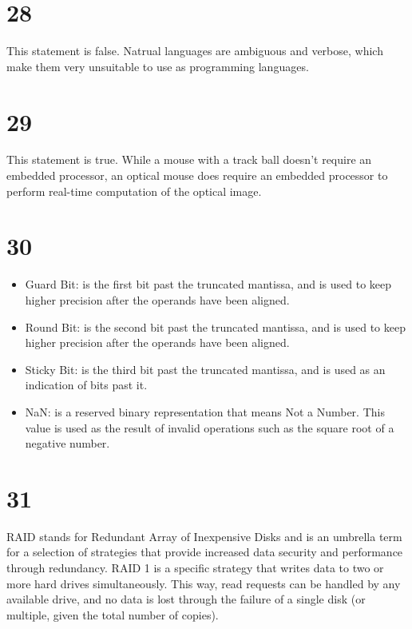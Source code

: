 \documentclass[a4paper,11pt]{article}
\begin{document}

\section*{28}
This statement is false.  Natrual languages are ambiguous and verbose, which make them very unsuitable to use as programming languages.


\section*{29}
This statement is true.  While a mouse with a track ball doesn't require an embedded processor, an optical mouse does require an embedded processor to perform real-time computation of the optical image. 


\section*{30}
\begin{itemize}
  \item Guard Bit:  is the first bit past the truncated mantissa, and is used to keep higher precision after the operands have been aligned.
  \item Round Bit: is the second bit past the truncated mantissa, and is used to keep higher precision after the operands have been aligned.
  \item Sticky Bit: is the third bit past the truncated mantissa, and is used as an indication of bits past it.
  \item NaN: is a reserved binary representation that means Not a Number.  This value is used as the result of invalid operations such as the square root of a negative number.
\end{itemize}


\section*{31}
RAID stands for Redundant Array of Inexpensive Disks and is an umbrella term for a selection of strategies that provide increased data security and performance through redundancy.  RAID 1 is a specific strategy that writes data to two or more hard drives simultaneously.  This way, read requests can be handled by any available drive, and no data is lost through the failure of a single disk (or multiple, given the total number of copies).
 
\end{document}
